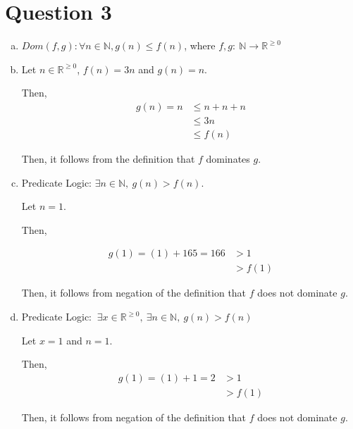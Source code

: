 \documentclass[12pt]{article}
\begin{document}
\section*{Question 3}
\begin{enumerate}[a.]
    \item

    $Dom(f,g):\forall n \in \mathbb{N}, g(n) \leq f(n)$, where $f,g:\:\mathbb{N} \to \mathbb{R}^{\geq0}$

    \item

    Let $n \in \mathbb{R}^{\geq0}$, $f(n) = 3n$ and $g(n) = n$.

    \bigskip

    Then,
    \setcounter{equation}{0}
    \begin{align}
        g(n) = n &\leq n + n + n\\
        &\leq 3n\\
        &\leq f(n)
    \end{align}

    \bigskip

    Then, it follows from the definition that $f$ dominates $g$.

    \item

    Predicate Logic: $\exists n \in \mathbb{N},\:g(n) > f(n)$.

    \bigskip

    Let $n = 1$.

    \bigskip

    Then,

    \setcounter{equation}{0}
    \begin{align}
        g(1) = (1) + 165 = 166 &> 1\\
        &> f(1)
    \end{align}

    \bigskip

    Then, it follows from negation of the definition that $f$ does not dominate $g$.

    \item

    Predicate Logic: $\:\exists x \in \mathbb{R}^{\geq 0},\:\exists n \in \mathbb{N},\:g(n) > f(n)$

    \bigskip

    Let $x = 1$ and $n = 1$.

    \bigskip

    Then,
    \setcounter{equation}{0}
    \begin{align}
        g(1) = (1) + 1 = 2 &> 1\\
        &> f(1)
    \end{align}

    \bigskip

    Then, it follows from negation of the definition that $f$ does not dominate $g$.


\end{enumerate}
\end{document}
